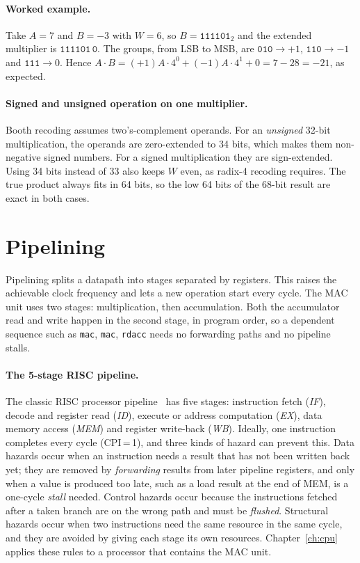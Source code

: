 \documentclass[11pt,a4paper]{report}
\newcommand{\code}[1]{\texttt{#1}}
\begin{document}
\paragraph{Worked example.}
Take $A=7$ and $B=-3$ with $W=6$, so $B=\mathtt{111101}_2$ and the extended
multiplier is $\mathtt{111101\,0}$. The groups, from LSB to MSB, are
$\mathtt{010}\rightarrow+1$, $\mathtt{110}\rightarrow-1$ and
$\mathtt{111}\rightarrow 0$. Hence
$A\cdot B = (+1)A\cdot 4^0 + (-1)A\cdot 4^1 + 0 = 7 - 28 = -21$, as expected.

\paragraph{Signed and unsigned operation on one multiplier.}
Booth recoding assumes two's-complement operands. For an \emph{unsigned}
32-bit multiplication, the operands are zero-extended to 34 bits, which makes
them non-negative signed numbers. For a signed multiplication they are
sign-extended. Using 34 bits instead of 33 also keeps $W$ even, as radix-4
recoding requires. The true product always fits in 64 bits, so the low 64
bits of the 68-bit result are exact in both cases.

\section{Pipelining}
Pipelining splits a datapath into stages separated by registers. This raises
the achievable clock frequency and lets a new operation start every cycle.
The MAC unit uses two stages: multiplication, then accumulation. Both the
accumulator read and write happen in the second stage, in program order, so
a dependent sequence such as \code{mac}, \code{mac}, \code{rdacc} needs no
forwarding paths and no pipeline stalls.

\paragraph{The 5-stage RISC pipeline.}
The classic RISC processor pipeline~\cite{patterson} has five stages:
instruction fetch (\emph{IF}), decode and register read (\emph{ID}), execute
or address computation (\emph{EX}), data memory access (\emph{MEM}) and
register write-back (\emph{WB}). Ideally, one instruction completes every cycle
(CPI\,=\,1), and three kinds of hazard can prevent this. Data hazards occur when
an instruction needs a result that has not been written back yet; they are
removed by \emph{forwarding} results from later pipeline registers, and only
when a value is produced too late, such as a load result at the end of MEM, is
a one-cycle \emph{stall} needed. Control hazards occur because the instructions
fetched after a taken branch are on the wrong path and must be \emph{flushed}.
Structural hazards occur when two instructions need the same resource in the
same cycle, and they are avoided by giving each stage its own resources.
Chapter~\ref{ch:cpu} applies these rules to a processor that contains the MAC
unit.
\end{document}
